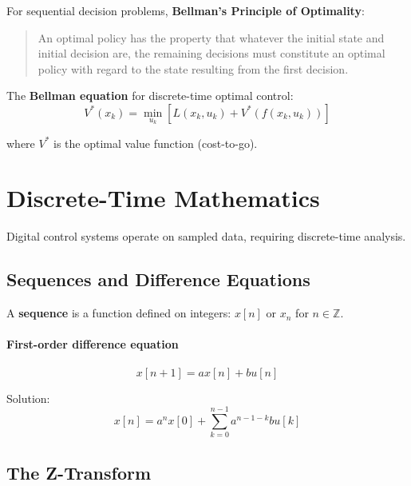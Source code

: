For sequential decision problems, \textbf{Bellman's Principle of Optimality}:

\begin{quote}
An optimal policy has the property that whatever the initial state and initial decision are, the remaining decisions must constitute an optimal policy with regard to the state resulting from the first decision.
\end{quote}

The \textbf{Bellman equation} for discrete-time optimal control:
\begin{equation}
V^*(x_k) = \min_{u_k} \left[ L(x_k, u_k) + V^*(f(x_k, u_k)) \right]
\end{equation}

where $V^*$ is the optimal value function (cost-to-go).

\chapter{Discrete-Time Mathematics}
\label{ch:discrete}

Digital control systems operate on sampled data, requiring discrete-time analysis.

\section{Sequences and Difference Equations}

A \textbf{sequence} is a function defined on integers: $x[n]$ or $x_n$ for $n \in \mathbb{Z}$.

\subsubsection{First-order difference equation}
\begin{equation}
x[n+1] = ax[n] + bu[n]
\end{equation}

Solution:
\begin{equation}
x[n] = a^n x[0] + \sum_{k=0}^{n-1} a^{n-1-k} bu[k]
\end{equation}

\section{The Z-Transform}

